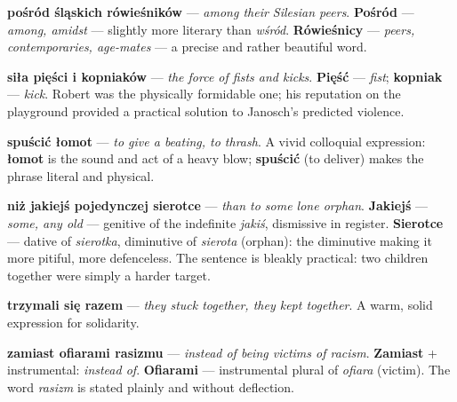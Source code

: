 \textbf{pośród śląskich rówieśników} --- \textit{among their Silesian
peers}. \textbf{Pośród} --- \textit{among, amidst} --- slightly more
literary than \textit{wśród}. \textbf{Rówieśnicy} --- \textit{peers,
contemporaries, age-mates} --- a precise and rather beautiful word.



\textbf{siła pięści i kopniaków} --- \textit{the force of fists and
kicks}. \textbf{Pięść} --- \textit{fist}; \textbf{kopniak} ---
\textit{kick}. Robert was the physically formidable one; his reputation
on the playground provided a practical solution to Janosch's predicted
violence.

\textbf{spuścić łomot} --- \textit{to give a beating, to thrash}. A
vivid colloquial expression: \textbf{łomot} is the sound and act of a
heavy blow; \textbf{spuścić} (to deliver) makes the phrase literal and
physical.

\textbf{niż jakiejś pojedynczej sierotce} --- \textit{than to some
lone orphan}. \textbf{Jakiejś} --- \textit{some, any old} --- genitive
of the indefinite \textit{jakiś}, dismissive in register.
\textbf{Sierotce} --- dative of \textit{sierotka}, diminutive of
\textit{sierota} (orphan): the diminutive making it more pitiful, more
defenceless. The sentence is bleakly practical: two children together
were simply a harder target.



\textbf{trzymali się razem} --- \textit{they stuck together, they kept
together}. A warm, solid expression for solidarity.

\textbf{zamiast ofiarami rasizmu} --- \textit{instead of being victims
of racism}. \textbf{Zamiast} + instrumental: \textit{instead of}.
\textbf{Ofiarami} --- instrumental plural of \textit{ofiara} (victim).
The word \textit{rasizm} is stated plainly and without deflection.

